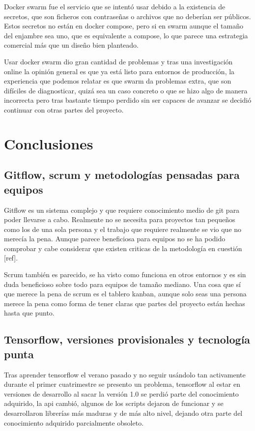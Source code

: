 Docker swarm fue el servicio que se intentó usar debido a la existencia de secretos, que son ficheros con contraseñas o archivos que no deberían ser públicos. Estos secretos no están en docker compose, pero si en swarm aunque el tamaño del enjambre sea uno, que es equivalente a compose, lo que parece una estrategia comercial más que un diseño bien planteado.

Usar docker swarm dio gran cantidad de problemas y tras una investigación online la opinión general es que ya está listo para entornos de producción, la experiencia que podemos relatar es que swarm da problemas extra, que son difíciles de diagnosticar, quizá sea un caso concreto o que se hizo algo de manera incorrecta pero tras bastante tiempo perdido sin ser capaces de avanzar se decidió continuar con otras partes del proyecto.


\section{Conclusiones}

\subsection{Gitflow, scrum y metodologías pensadas para equipos}

Gitflow es un sistema complejo y que requiere conocimiento medio de git para poder llevarse a cabo. Realmente no se necesita para proyectos tan pequeños como los de una sola persona y el trabajo que requiere realmente se vio que no merecía la pena. Aunque parece beneficiosa para equipos no se ha podido comprobar y cabe considerar que existen criticas de la metodología en cuestión [ref].

Scrum también es parecido, se ha visto como funciona en otros entornos y es sin duda beneficioso sobre todo para equipos de tamaño mediano. Una cosa que sí que merece la pena de scrum es el tablero kanban, aunque solo seas una persona merece la pena como forma de tener claras que partes del proyecto están hechas hasta que punto.

\subsection{Tensorflow, versiones provisionales y tecnología punta}

Tras aprender tensorflow el verano pasado y no seguir usándolo tan activamente durante el primer cuatrimestre se presento un problema, tensorflow al estar en versiones de desarrollo al sacar la versión 1.0 se perdió parte del conocimiento adquirido, la api cambió, algunos de los scripts dejaron de funcionar y se desarrollaron librerías  más maduras y de más alto nivel, dejando otra parte del conocimiento adquirido parcialmente obsoleto.

